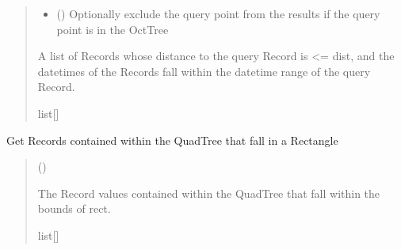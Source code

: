 \documentclass[letterpaper,10pt,english]{sphinxmanual}
\begin{document}
\begin{fulllineitems}
\begin{fulllineitems}
\begin{quote}
\begin{description}
\begin{itemize}
\item {}
\sphinxAtStartPar
{} () \textendash{} Optionally exclude the query point from the results if the query
point is in the OctTree

\end{itemize}

\sphinxAtStartPar
A list of Records whose distance to the
query Record is \textless{}= dist, and the datetimes of the
Records fall within the datetime range of the query
Record.

\sphinxAtStartPar
list{[}{\hyperref[\detokenize{record:geotrees.record.Record}]{}}{]}

\end{description}\end{quote}

\end{fulllineitems}


\begin{fulllineitems}
\label{\detokenize{quadtree:geotrees.quadtree.QuadTree.query}}
\pysigstartsignatures
\pysiglinewithargsret
{}
{\sphinxparamcomma {}}
{}
\pysigstopsignatures
\sphinxAtStartPar
Get Records contained within the QuadTree that fall in a
Rectangle
\begin{quote}\begin{description}
\sphinxAtStartPar
{} ({\hyperref[\detokenize{shape:geotrees.shape.Rectangle}]{}})

\sphinxAtStartPar
The Record values contained within the QuadTree that fall
within the bounds of rect.

\sphinxAtStartPar
list{[}{\hyperref[\detokenize{record:geotrees.record.Record}]{}}{]}

\end{description}\end{quote}

\end{fulllineitems}


\end{fulllineitems}
\end{document}
